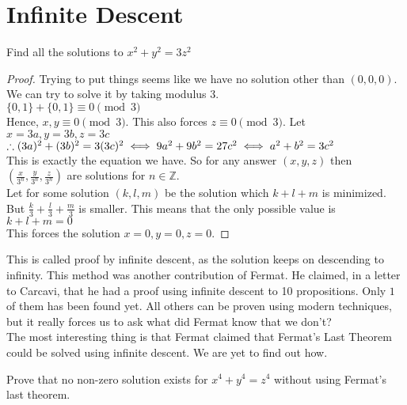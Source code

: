 \section{Infinite Descent}
\begin{example}
    Find all the solutions to $x^2+y^2=3z^2$
\end{example}
\begin{proof}
    Trying to put things seems like we have no solution other than $(0,0,0)$.\\
    We can try to solve it by taking modulus $3$.\\
    $\{0,1\}+\{0,1\} \equiv 0 \pmod{3}$\\
    Hence, $x,y \equiv 0\pmod{3}$. This also forces $z \equiv 0 \pmod{3}$. Let $x=3a, y=3b, z=3c$\\
    $\therefore (3a)^2+(3b)^2=3(3c)^2\\
    \iff 9a^2+9b^2=27c^2\\
    \iff a^2+b^2=3c^2$\\
    This is exactly the equation we have. So for any answer $(x,y,z)$ then $(\frac{x}{3^n},\frac{y}{3^n},\frac{z}{3^n})$ are solutions for $n \in \mathbb{Z}$. \\
    Let for some solution $(k,l,m)$ be the solution which $k+l+m$ is minimized. But $\frac{k}{3}+\frac{l}{3}+\frac{m}{3}$ is smaller. This means that the only possible value is $k+l+m=0$\\
    This forces the solution $x=0, y=0, z=0$.
\end{proof}
This is called proof by infinite descent, as the solution keeps on descending to infinity. This method was another contribution of Fermat. He claimed, in a letter to Carcavi, that he had a proof using infinite descent to 10 propositions. Only $1$ of them has been found yet. All others can be proven using modern techniques, but it really forces us to ask what did Fermat know that we don't?\\
The most interesting thing is that Fermat claimed that Fermat's Last Theorem could be solved using infinite descent. We are yet to find out how.\\
\begin{example}
    Prove that no non-zero solution exists for $x^4+y^4=z^4$ without using Fermat's last theorem.
\end{example}
